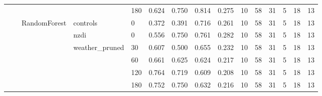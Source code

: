 \begin{longtable}{lllllrrrrrrrrrr}
 &  &  &  & 180 & 0.624 & 0.750 & 0.814 & 0.275 & 10 & 58 & 31 & 5 & 18 & 13 \\
\cline{3-15} \cline{4-15}
 &  & \multirow[t]{6}{*}{RandomForest} & controls & 0 & 0.372 & 0.391 & 0.716 & 0.261 & 10 & 58 & 31 & 5 & 18 & 13 \\
\cline{4-15}
 &  &  & nzdi & 0 & 0.556 & 0.750 & 0.761 & 0.282 & 10 & 58 & 31 & 5 & 18 & 13 \\
\cline{4-15}
 &  &  & \multirow[t]{4}{*}{weather_pruned} & 30 & 0.607 & 0.500 & 0.655 & 0.232 & 10 & 58 & 31 & 5 & 18 & 13 \\
 &  &  &  & 60 & 0.661 & 0.625 & 0.624 & 0.217 & 10 & 58 & 31 & 5 & 18 & 13 \\
 &  &  &  & 120 & 0.764 & 0.719 & 0.609 & 0.208 & 10 & 58 & 31 & 5 & 18 & 13 \\
 &  &  &  & 180 & 0.752 & 0.750 & 0.632 & 0.216 & 10 & 58 & 31 & 5 & 18 & 13 \\
\cline{1-15} \cline{2-15} \cline{3-15} \cline{4-15}
\end{longtable}
